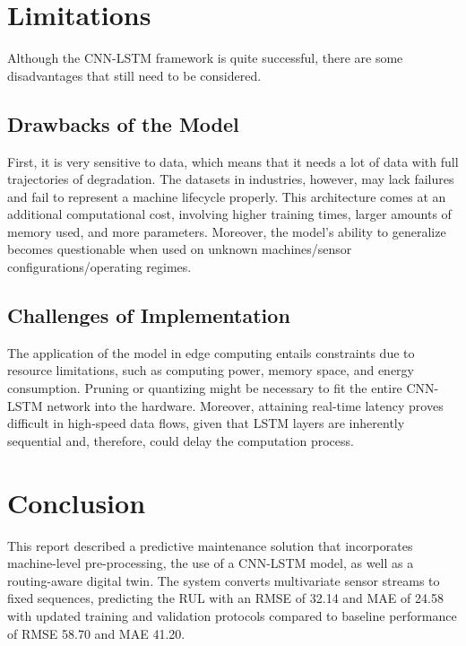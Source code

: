 \documentclass[conference]{IEEEtran}
\begin{document}
\section{Limitations}

Although the CNN-LSTM framework is quite successful, there are some disadvantages that still need to be considered.

\subsection{Drawbacks of the Model}
First, it is very sensitive to data, which means that it needs a lot of data with full trajectories of degradation. The datasets in industries, however, may lack failures and fail to represent a machine lifecycle properly. This architecture comes at an additional computational cost, involving higher training times, larger amounts of memory used, and more parameters. Moreover, the model’s ability to generalize becomes questionable when used on unknown machines/sensor configurations/operating regimes.

\subsection{Challenges of Implementation}
The application of the model in edge computing entails constraints due to resource limitations, such as computing power, memory space, and energy consumption. Pruning or quantizing might be necessary to fit the entire CNN-LSTM network into the hardware. Moreover, attaining real-time latency proves difficult in high-speed data flows, given that LSTM layers are inherently sequential and, therefore, could delay the computation process.

\section{Conclusion}

This report described a predictive maintenance solution that incorporates machine-level pre-processing, the use of a CNN-LSTM model, as well as a routing-aware digital twin. The system converts multivariate sensor streams to fixed sequences, predicting the RUL with an RMSE of 32.14 and MAE of 24.58 with updated training and validation protocols compared to baseline performance of RMSE 58.70 and MAE 41.20.
\end{document}
